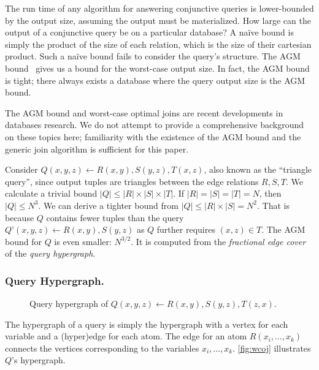The run time of any algorithm for answering conjunctive queries
 is lower-bounded by the output size,
 assuming the output must be materialized.
How large can the output of a conjunctive query be on a particular database?
A na{\"i}ve bound is simply the product of the size of each relation,
 which is the size of their cartesian product.
Such a na{\"i}ve bound fails to consider the query's structure.
The AGM bound~\cite{agm}
 gives us a bound for the worst-case output size.
In fact, the AGM bound is tight;
 there always exists a database
 where the query output size is the AGM bound.

The AGM bound and worst-case optimal joins
 are recent developments in databases research.
We do not attempt to provide a comprehensive
 background on these topics here;
 familiarity with the existence of the AGM bound
 and the generic join algorithm is sufficient for this paper.

Consider $Q(x,y,z) \leftarrow R(x,y), S(y,z), T(x,z) $,
 also known as the ``triangle query'',
 since output tuples are triangles between the edge relations $R,S,T$.
We calculate a trivial bound $|Q| \leq |R| \times |S| \times |T|$.
If $|R|=|S|=|T|=N$, then $|Q| \leq N^3$.
We can derive a tighter bound from $|Q| \leq |R| \times |S| = N^2$.
That is because $Q$
contains fewer tuples than the query $ Q’(x,y,z) \leftarrow R(x,y), S(y,z) $
as $Q$ further requires $(x,z) \in T$.
The AGM bound for $Q$ is even smaller: $N^{3/2}$.
It is computed from the \emph{fractional edge
  cover} of the \emph{query hypergraph}.

\subsubsection*{Query Hypergraph.}
\label{sec:hypergraph}

\begin{figure}
  \centering {}
  \caption{ Query hypergraph of $Q(x, y, z) \gets R(x,y), S(y,z), T(z, x)$. }\label{fig:wcoj}
\end{figure}

The hypergraph of a query is simply the hypergraph
 with
 a vertex for each variable
 and a (hyper)edge for each atom.
The edge for an atom $R(x_{i}, \ldots, x_{k})$ connects the vertices
 corresponding to the variables $x_{i}, \ldots, x_{k}$.
\autoref{fig:wcoj} illustrates $Q$'s hypergraph.

